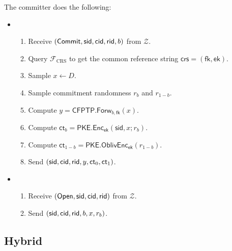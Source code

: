 \documentclass[11pt,letterpaper]{article}
\theoremstyle{plain} %
\theoremstyle{definition} %
\theoremstyle{remark} %
\newcommand{\OpenMsg}{\mathsf{Open}}
\newcommand{\CommitMsg}{\mathsf{Commit}}
\newcommand{\Input}{x}
\newcommand{\PKE}{\mathsf{PKE}}
\newcommand{\Enc}{\mathsf{Enc}}
\newcommand{\OblivEnc}{\mathsf{OblivEnc}}
\newcommand{\EncKey}{\mathsf{ek}}
\newcommand{\Ct}{\mathsf{ct}}
\newcommand{\Rand}{r}
\newcommand{\CFPTP}{\mathsf{CFPTP}}
\newcommand{\Forw}{\mathsf{Forw}}
\newcommand{\ForwKey}{\mathsf{fk}}
\newcommand{\Domain}{D}
\newcommand{\Output}{y}
\newcommand{\Environment}{{\mathcal{Z}}} %
\newcommand{\IF}{\mathcal{F}} %
\newcommand{\sid}{\mathsf{sid}}
\newcommand{\IFCrs}{\IF_{\mathrm{CRS}}}
\newcommand{\crs}{\mathsf{crs}}
\newcommand{\CommBit}{b}
\begin{document}
The committer does the following:
\begin{itemize}
\item {}
\begin{enumerate}[nolistsep]
	\item Receive $(\CommitMsg,\sid,\CommitterId,\ReceiverId,\CommBit)$ from $\Environment$.
	\item Query $\IFCrs$ to get the common reference string $\crs = (\ForwKey, \EncKey)$.
	\item Sample $\Input \gets \Domain$.
	\item Sample commitment randomness $\Rand_{\CommBit}$ and $\Rand_{1-\CommBit}$.
	\item Compute $\Output = \CFPTP.\Forw_{\CommBit, \ForwKey}(\Input)$.
	\item Compute $\Ct_{\CommBit} = \PKE.\Enc_\EncKey(\sid,\Input; \Rand_\CommBit)$.
	\item Compute $\Ct_{1-\CommBit} = \PKE.\OblivEnc_\EncKey(\Rand_{1-\CommBit})$.
	\item Send $(\sid,\CommitterId,\ReceiverId,\Output, \Ct_0, \Ct_1)$.
\end{enumerate}

\item {}
\begin{enumerate}[nolistsep]
    \item Receive $(\OpenMsg,\sid,\CommitterId,\ReceiverId)$ from $\Environment$.
    \item Send $(\sid,\CommitterId,\ReceiverId,\CommBit, \Input, \Rand_{\CommBit})$.
\end{enumerate}
\end{itemize}

\subsection{Hybrid}
\label{sec:hyb-distr}
\end{document}
